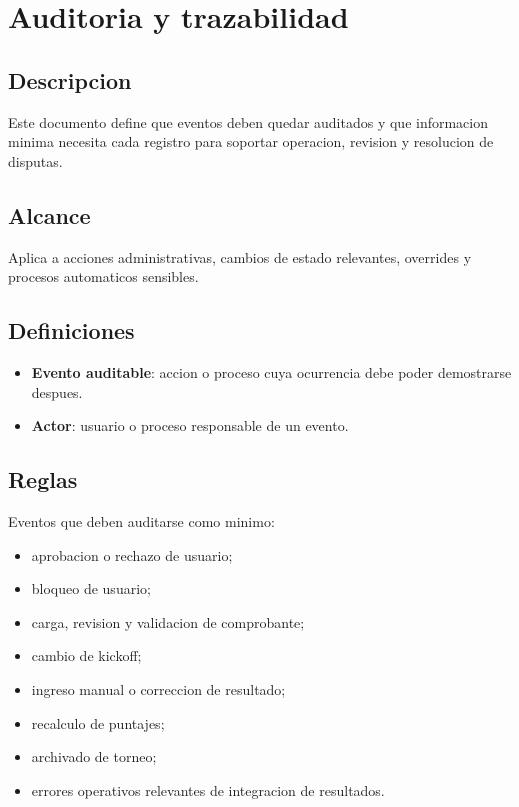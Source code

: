 \section{Auditoria y trazabilidad}

\subsection{Descripcion}

Este documento define que eventos deben quedar auditados y que informacion minima necesita cada registro para soportar operacion, revision y resolucion de disputas.

\subsection{Alcance}

Aplica a acciones administrativas, cambios de estado relevantes, overrides y procesos automaticos sensibles.

\subsection{Definiciones}

\begin{itemize}
  \item \textbf{Evento auditable}: accion o proceso cuya ocurrencia debe poder demostrarse despues.
  \item \textbf{Actor}: usuario o proceso responsable de un evento.
\end{itemize}

\subsection{Reglas}

Eventos que deben auditarse como minimo:

\begin{itemize}
  \item aprobacion o rechazo de usuario;
  \item bloqueo de usuario;
  \item carga, revision y validacion de comprobante;
  \item cambio de kickoff;
  \item ingreso manual o correccion de resultado;
  \item recalculo de puntajes;
  \item archivado de torneo;
  \item errores operativos relevantes de integracion de resultados.
\end{itemize}


